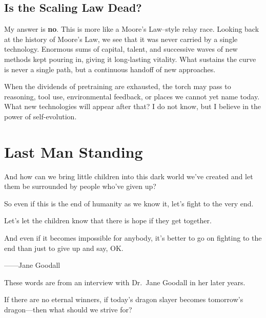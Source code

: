 \subsection*{Is the Scaling Law Dead?}

My answer is \textbf{no}. This is more like a Moore's Law--style relay race. Looking back at the history of Moore's Law, we see that it was never carried by a single technology. Enormous sums of capital, talent, and successive waves of new methods kept pouring in, giving it long-lasting vitality. What sustains the curve is never a single path, but a continuous handoff of new approaches.

\vspace{1em}

When the dividends of pretraining are exhausted, the torch may pass to reasoning, tool use, environmental feedback, or places we cannot yet name today. What new technologies will appear after that? I do not know, but I believe in the power of self-evolution.



\newpage
\section{Last Man Standing}

\begin{myquote}
And how can we bring little children into this dark world we've created and let them be surrounded by people who've given up?

\vspace{1em}

So even if this is the end of humanity as we know it, let's fight to the very end.

\vspace{1em}


Let's let the children know that there is hope if they get together.

\vspace{1em}

And even if it becomes impossible for anybody, it's better to go on fighting to the end than just to give up and say, OK.

\hfill ——Jane Goodall
\end{myquote}

These words are from an interview with Dr.\ Jane Goodall in her later years.

\vspace{1em}

If there are no eternal winners, if today's dragon slayer becomes tomorrow's dragon---then what should we strive for?

